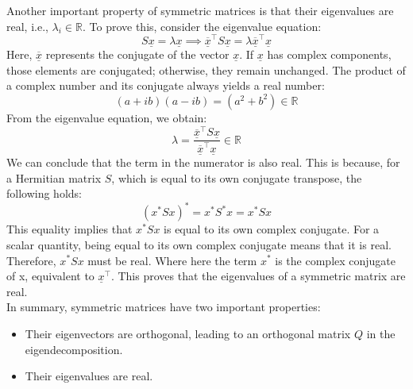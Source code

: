 Another important property of symmetric matrices is that their eigenvalues are real, i.e., $\lambda_i \in \mathbb{R}$. To prove this, consider the eigenvalue equation:
\[
    S\underline{x} = \lambda\underline{x} \implies \overline{\underline{x}}^\intercal S\underline{x} = \lambda\overline{\underline{x}}^\intercal\underline{x}
\]
Here, $\overline{\underline{x}}$ represents the conjugate of the vector $\underline{x}$. If $\underline{x}$ has complex components, those elements are conjugated; otherwise, they remain unchanged. The product of a complex number and its conjugate always yields a real number:
\[
    (a + ib)(a - ib) = (a^2 + b^2) \in \mathbb{R}    
\]
From the eigenvalue equation, we obtain:
\[
    \lambda = \frac{\overline{\underline{x}}^\intercal S\underline{x}}{\overline{\underline{x}}^\intercal\underline{x}} \in \mathbb{R}
\]
We can conclude that the term in the numerator is also real. This is because, for a Hermitian matrix \( S \), which is equal to its own conjugate transpose, the following holds:
\[ (x^* S x)^* = x^* S^* x = x^* S x \]
This equality implies that \( x^* S x \) is equal to its own complex conjugate. For a scalar quantity, being equal to its own complex conjugate means that it is real. Therefore, \( x^* S x \) must be real. Where here the term $x^*$ is the complex conjugate of x, equivalent to $\underline{x}^\intercal$.
This proves that the eigenvalues of a symmetric matrix are real.\\ 
In summary, symmetric matrices have two important properties:
\begin{itemize}
    \item Their eigenvectors are orthogonal, leading to an orthogonal matrix \( Q \) in the eigendecomposition.
    \item Their eigenvalues are real.
\end{itemize}


